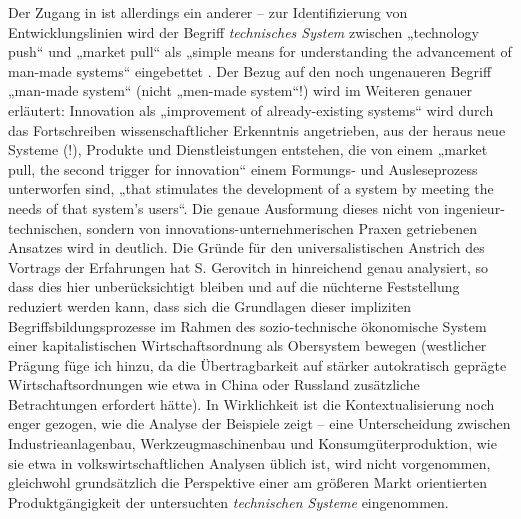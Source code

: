 \documentclass[11pt,a4paper]{article}
\begin{document}
Der Zugang in \cite{TESE2018} ist allerdings ein anderer -- zur
Identifizierung von Entwicklungslinien wird der Begriff \emph{technisches
  System} zwischen „technology push“ und „market pull“ als „simple means for
understanding the advancement of man-made systems“ eingebettet
\cite[S. 1]{TESE2018}. Der Bezug auf den noch ungenaueren Begriff „man-made
system“ (nicht „men-made system“!) wird im Weiteren genauer erläutert:
Innovation als „improvement of already-existing systems“ wird durch das
Fortschreiben wissenschaftlicher Erkenntnis angetrieben, aus der heraus neue
Systeme (!), Produkte und Dienstleistungen entstehen, die von einem „market
pull, the second trigger for innovation“ einem Formungs- und Ausleseprozess
unterworfen sind, „that stimulates the development of a system by meeting the
needs of that system's users“.  Die genaue Ausformung dieses nicht von
ingenieur-technischen, sondern von innovations-unternehmerischen Praxen
getriebenen Ansatzes wird in \cite[Kap. 3]{TESE2018} deutlich.  Die Gründe für
den universalistischen Anstrich des Vortrags der Erfahrungen hat S. Gerovitch
in \cite{Gerovitch1996} hinreichend genau analysiert, so dass dies hier
unberücksichtigt bleiben und auf die nüchterne Feststellung reduziert werden
kann, dass sich die Grundlagen dieser impliziten Begriffsbildungsprozesse im
Rahmen des sozio-technische ökonomische System einer kapitalistischen
Wirtschaftsordnung als Obersystem bewegen (westlicher Prägung füge ich hinzu,
da die Übertragbarkeit auf stärker autokratisch geprägte Wirtschaftsordnungen
wie etwa in China oder Russland zusätzliche Betrachtungen erfordert hätte).
In Wirklichkeit ist die Kontextualisierung noch enger gezogen, wie die Analyse
der Beispiele zeigt -- eine Unterscheidung zwischen Industrieanlagenbau,
Werkzeugmaschinenbau und Konsumgüterproduktion, wie sie etwa in
volkswirtschaftlichen Analysen üblich ist, wird nicht vorgenommen, gleichwohl
grundsätzlich die Perspektive einer am größeren Markt orientierten
Produktgängigkeit der untersuchten \emph{technischen Systeme} eingenommen.
\end{document}
